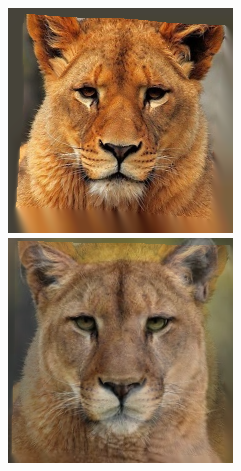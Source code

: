 \documentclass[conference]{IEEEtran}
\begin{document}
\begin{figure}[H]
\begin{multicols}{3}
    \centering
    \includegraphics[width=1.0\linewidth]{results/cats/B/img01.png} \par
    \includegraphics[width=1.0\linewidth]{results/cats/B/img30.png} \par
    

\end{multicols}
\end{figure}
\end{document}
